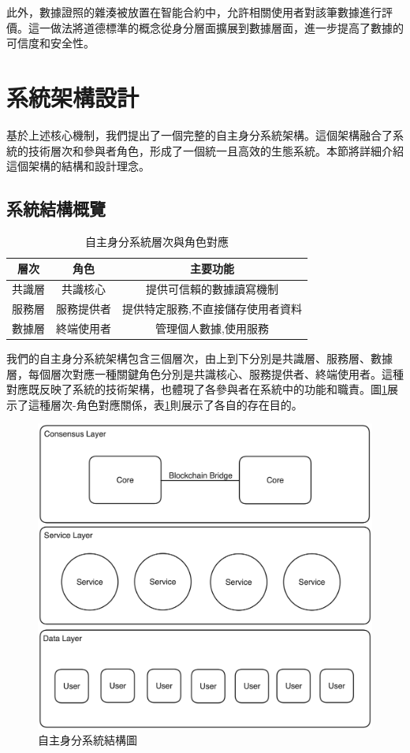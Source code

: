 此外，數據證照的雜湊被放置在智能合約中，允許相關使用者對該筆數據進行評價。這一做法將道德標準的概念從身分層面擴展到數據層面，進一步提高了數據的可信度和安全性。
\section{系統架構設計}
基於上述核心機制，我們提出了一個完整的自主身分系統架構。這個架構融合了系統的技術層次和參與者角色，形成了一個統一且高效的生態系統。本節將詳細介紹這個架構的結構和設計理念。
\subsection{系統結構概覽}
\begin{table}[h]
  \centering
  \begin{tabular}{|c|c|c|}
    \hline
    層次  & 角色    & 主要功能              \\
    \hline
    共識層 & 共識核心  & 提供可信賴的數據讀寫機制      \\
    \hline
    服務層 & 服務提供者 & 提供特定服務,不直接儲存使用者資料 \\
    \hline
    數據層 & 終端使用者 & 管理個人數據,使用服務       \\
    \hline
  \end{tabular}
  \caption{自主身分系統層次與角色對應}
  \label{tab:system-layers}
\end{table}
我們的自主身分系統架構包含三個層次，由上到下分別是共識層、服務層、數據層，每個層次對應一種關鍵角色分別是共識核心、服務提供者、終端使用者。這種對應既反映了系統的技術架構，也體現了各參與者在系統中的功能和職責。圖\ref{fig:aid-system-layer}展示了這種層次-角色對應關係，表\ref{tab:system-layers}則展示了各自的存在目的。
\begin{figure}[h]
  \centering
  \includegraphics[width=\linewidth,keepaspectratio]{figures/aidLayers.png}
  \caption{自主身分系統結構圖}
  \label{fig:aid-system-layer}
\end{figure}
